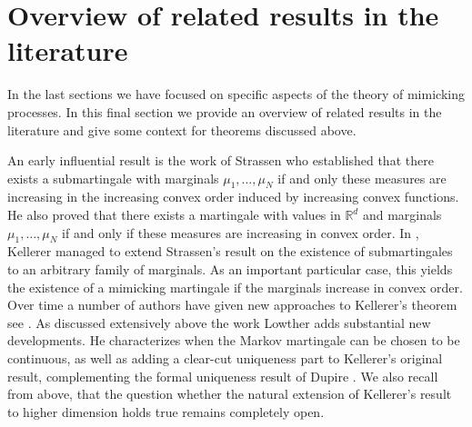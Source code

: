 \documentclass[11pt,a4paper]{article}%
\def\R{{\mathbb R}}
\numberwithin{equation}{section}
\begin{document}







 
 


\section{Overview of related results in the literature} In the last sections we have focused on specific aspects of the theory of mimicking processes. 
In this final section we provide an overview  of related results in the literature and give some context for theorems discussed above. %


An early influential result is the work of Strassen \cite{St65} who established that there exists a submartingale with marginals $\mu_1, \ldots, \mu_N$ if and only these measures are increasing in the increasing convex order induced by increasing convex functions. He also proved that there exists a martingale with values in $\R^d$ and marginals $\mu_1, \ldots, \mu_N$  if and only if these measures are increasing in convex order. 
In \cite{Ke72, Ke73}, Kellerer managed to extend Strassen's result on the existence of submartingales to an arbitrary family of marginals. As an important particular case, this yields the existence of a mimicking martingale if the marginals increase in convex order.
Over time a number of authors have given new approaches to Kellerer's theorem see \cite{HiRo12, HiRoYo14, Lo08a, Lo08b, Lo08d, BeHuSt16, BeJu21}. As discussed extensively above the work Lowther adds substantial new developments. He  characterizes when the Markov martingale can be chosen to be continuous, as well as adding a clear-cut uniqueness part to  Kellerer's original result, complementing the formal uniqueness result of Dupire \cite{Du94}. 
We also recall from  above, that the question whether the natural extension of Kellerer's result to higher dimension holds true remains completely open. 
\end{document}
